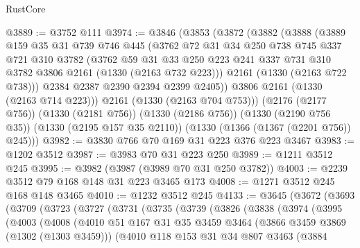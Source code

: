 \begin{lexlean}{RustCore}
\begin{coremodule}
{\begin{coremodule}
{{{{{{{{@3889 := @3752 @111
@3974 := @3846
    (@3853
      (@3872
        (@3882
          (@3888
            (@3889
              @159
              @35
              @31
              @739
              @746
              @445
              (@3762
                @72
                @31
                @34
                @250
                @738
                @745
                @337
                @721
                @310
                @3782
                (@3762
                  @59
                  @31
                  @33
                  @250
                  @223
                  @241
                  @337
                  @731
                  @310
                  @3782
                  @3806
                  @2161
                  (@1330 (@2163 @732 @223)))
                @2161
                (@1330 (@2163 @722 @738)))
              @2384
              @2387
              @2390
              @2394
              @2399
              @2405))
          @3806
          @2161
          (@1330 (@2163 @714 @223)))
        @2161
        (@1330 (@2163 @704 @753)))
      (@2176 (@2177 @756))
      (@1330 (@2181 @756))
      (@1330 (@2186 @756))
      (@1330 (@2190 @756 @35))
      (@1330 (@2195 @157 @35 @2110))
      (@1330 (@1366 (@1367 (@2201 @756)) @245)))
@3982 := @3830 @766 @70 @169 @31 @223 @376 @223 @3467
@3983 := @1202 @3512
@3987 := @3983 @70 @31 @223 @250
@3989 := @1211 @3512 @245
@3995 := @3982 (@3987 (@3989 @70 @31 @250 @3782))
@4003 := @2239 @3512 @79 @168 @148 @31 @223 @3465 @173
@4008 := @1271 @3512 @245 @168 @148 @3465
@4010 := @1232 @3512 @245
@4133 := @3645
    (@3672
      (@3693
        (@3709
          (@3723
            (@3727
              (@3731
                (@3735
                  (@3739
                    (@3826
                      (@3838
                        (@3974
                          (@3995
                            (@4003
                              (@4008
                                (@4010
                                  @51
                                  @167
                                  @31
                                  @35
                                  @3459
                                  @3464
                                  (@3866 @3459 @3869 (@1302 (@1303 @3459)))
                                  (@4010
                                    @118
                                    @153
                                    @31
                                    @34
                                    @807
                                    @3463
                                    (@3884
}}}}}}}}
\end{coremodule}}
\end{coremodule}
\end{lexlean}
